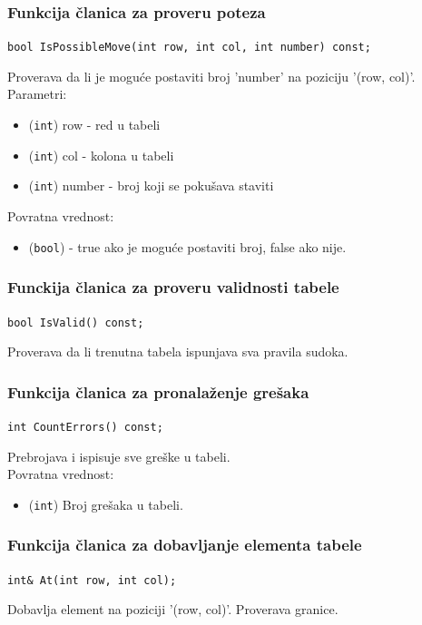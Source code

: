 \documentclass[a4paper]{article}
\begin{document}
    \subsubsection{Funkcija članica za proveru poteza}
    \texttt{bool IsPossibleMove(int row, int col, int number) const;}
    \par Proverava da li je moguće postaviti broj 'number' na poziciju '(row, col)'.\\
    Parametri:
    \begin{itemize}
        \item (\texttt{int}) row - red u tabeli
        \item (\texttt{int}) col - kolona u tabeli
        \item (\texttt{int}) number - broj koji se pokušava staviti
    \end{itemize}
    Povratna vrednost:
    \begin{itemize}
        \item (\texttt{bool}) - true ako je moguće postaviti broj, false ako nije.
    \end{itemize}

    \subsubsection{Funckija članica za proveru validnosti tabele}
    \texttt{bool IsValid() const;}
    \par Proverava da li trenutna tabela ispunjava sva pravila sudoka.
    
    \subsubsection{Funkcija članica za pronalaženje grešaka}
    \texttt{int CountErrors() const;}
    \par Prebrojava i ispisuje sve greške u tabeli.\\
    Povratna vrednost:
    \begin{itemize}
        \item (\texttt{int}) Broj grešaka u tabeli.
    \end{itemize}

    \subsubsection{Funkcija članica za dobavljanje elementa tabele}
    \texttt{int\& At(int row, int col);}
    \par Dobavlja element na poziciji '(row, col)'. Proverava granice.
    
\end{document}
